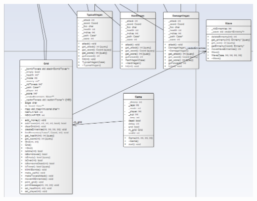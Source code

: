 \documentclass[12pt,a4paper]{article}
\begin{document}
  \includegraphics[height=20cm,width=20cm]{classDiagram4.PNG}
\end{document}
